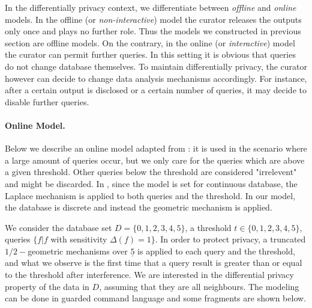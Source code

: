 In the differentially privacy context, we differentiate between \emph{offline} and \emph{online} models.
In the offline (or \emph{non-interactive}) model the curator releases the outputs only once and plays no further role. Thus the models we constructed in previous section are offline models. On the contrary, in the online (or \emph{interactive}) model the curator can permit further queries. In this setting it is obvious that queries do not change database themselves. To maintain differentially privacy, the curator however can decide to change data analysis mechanisms accordingly. For instance, after a certain output is disclosed or a certain number of queries, it may decide to disable further queries.


\paragraph{Online Model.}
Below we describe an online model adapted from \cite{}: it is used in the scenario where a large amount of queries occur, but we only care for the queries which
are above a given threshold. Other queries below the threshold are considered "irrelevent" and might be discarded. In \cite{}, since the model is set for continuous database, the Laplace mechanism is applied to both queries and the threshold. In our model, the database is discrete and instead the geometric mechanism is applied.

We consider the database set $D = \{0,1,2,3,4,5\}$, a threshold $t \in \{0,1,2,3,4,5\}$, queries $\{f| f $ with sensitivity $\Delta (f) = 1 \}$. In order to protect privacy, a truncated $1/2-$geometric mechanisms over $\underline{5}$ is applied to each query and the threshold, and what we observe is the first time that a query result is greater than or equal to the threshold after interference. We are interested in the differential privacy property of the data in $D$, assuming that they are all neighbours. The modeling can be done in guarded command language and some fragments are shown below.

